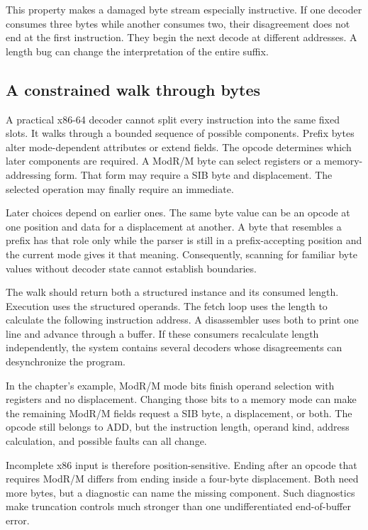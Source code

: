 This property makes a damaged byte stream especially instructive. If one
decoder consumes three bytes while another consumes two, their disagreement
does not end at the first instruction. They begin the next decode at different
addresses. A length bug can change the interpretation of the entire suffix.

\subsection{A constrained walk through bytes}

A practical x86-64 decoder cannot split every instruction into the same fixed
slots. It walks through a bounded sequence of possible components. Prefix
bytes alter mode-dependent attributes or extend fields. The opcode determines
which later components are required. A ModR/M byte can select registers or a
memory-addressing form. That form may require a SIB byte and displacement. The
selected operation may finally require an immediate.

Later choices depend on earlier ones. The same byte value can be an opcode at
one position and data for a displacement at another. A byte that resembles a
prefix has that role only while the parser is still in a prefix-accepting
position and the current mode gives it that meaning. Consequently, scanning
for familiar byte values without decoder state cannot establish boundaries.

The walk should return both a structured instance and its consumed length.
Execution uses the structured operands. The fetch loop uses the length to
calculate the following instruction address. A disassembler uses both to print
one line and advance through a buffer. If these consumers recalculate length
independently, the system contains several decoders whose disagreements can
desynchronize the program.

\begin{example}[title={A memory form expands the parse}]
In the chapter's  example, ModR/M mode bits  finish
operand selection with registers and no displacement. Changing those bits to a
memory mode can make the remaining ModR/M fields request a SIB byte, a
displacement, or both. The opcode still belongs to ADD, but the instruction
length, operand kind, address calculation, and possible faults can all change.
\end{example}

Incomplete x86 input is therefore position-sensitive. Ending after an opcode
that requires ModR/M differs from ending inside a four-byte displacement.
Both need more bytes, but a diagnostic can name the missing component. Such
diagnostics make truncation controls much stronger than one undifferentiated
end-of-buffer error.

